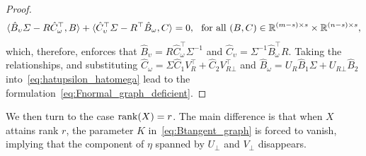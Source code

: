 \begin{proof}
    \begin{equation*}
        \langle {\hat{B}_\upsilon \varSigma-R\hat{C}^\top_\omega,B} \rangle+\langle {\hat{C}_\upsilon^\top\varSigma-R^\top \hat{B}_\omega,C} \rangle=0,\ \ \text{for all}\ (B,C)\in\mathbb{R}^{(m-s)\times s}\times \mathbb{R}^{(n-s)\times s},
    \end{equation*}
     which, therefore, enforces that $\hat{B}_\upsilon=R\hat{C}^\top_\omega\varSigma^{-1}$ and $\hat{C}_\upsilon=\varSigma^{-1}\hat{B}_\omega^\top R$.  Taking  the relationships, and substituting $\hat{C}_\omega=\varSigma\hat{C}_1V^\top_R+\hat{C}_2V_{R\bot}^\top$ and $\hat{B}_\omega=U_R\hat{B}_1\varSigma+U_{R\bot}\hat{B}_2$ into~\eqref{eq:hatupsilon_hatomega} lead to the formulation~\eqref{eq:Fnormal_graph_deficient}.
\end{proof} 

We then turn to the case $\operatorname{rank}(X)=r$. The main difference is that when $X$ attains rank $r$, the parameter $K$ in~\eqref{eq:Btangent_graph} is forced to vanish, implying that the component of $\eta$ spanned by $U_\bot$ and $V_\bot$ disappears. 

